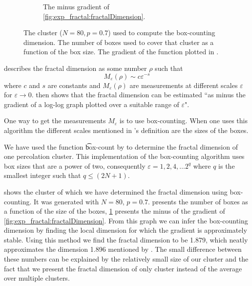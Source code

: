 \begin{figure}
\begin{subfigure}[t]{0.3\textwidth}
		\caption{The minus gradient of \cref{fig:exp_fractal:fractalDimension}.}
		\label{fig:exp_fractal:fractalDimensionGradient}
	\end{subfigure}		
	\caption{ The cluster ($N = 80, p = 0.7$) used to compute the box-counting dimension.  The number of boxes used to cover that cluster as a function of the box size.  The gradient of the function plotted in .}
	\label{fig:exp:dimension:plaatjes}
\end{figure}

\textcite{falconer2004fractal} describes the fractal dimension as some number $\rho$ such that
\begin{equation}
	M_\varepsilon(\rho) \sim c\varepsilon^{-s}
\end{equation}
where $c$ and $s$ are constants and $M_\varepsilon(\rho)$ are measurements at different scales $\varepsilon$ for $\varepsilon \to 0$. \citeauthor{falconer2004fractal} then shows that the fractal dimension can be estimated ``as minus the gradient of a log-log graph plotted over a suitable range of $\varepsilon$"\cite{falconer2004fractal}. 

One way to get the measurements $M_\varepsilon$ is to use box-counting. When one uses this algorithm the different scales mentioned in \citeauthor{falconer2004fractal}'s definition are the sizes of the boxes.

We have used the function \t{box-count} by \textcite{boxCounting} to determine the fractal dimension of one percolation cluster. This implementation of the box-counting algorithm uses box sizes that are a power of two, consequently $\varepsilon = 1, 2, 4, \dotsc 2^q$ where $q$ is the smallest integer such that $q \leq (2N + 1)$. 

 shows the cluster of which we have determined the fractal dimension using box-counting. It was generated with $N = 80$, $p = 0.7$.  presents the number of boxes as a function of the size of the boxes, \cref{fig:exp_fractal:fractalDimensionGradient} presents the minus of the gradient of \cref{fig:exp_fractal:fractalDimension}. From this graph we can infer the box-counting dimension by finding the local dimension for which the gradient is approximately stable. Using this method we find the fractal dimension to be \num{1.879}, which neatly approximates the dimension \num{1.896} mentioned by \textcite{stauffer1994introduction}. The small difference between these numbers can be explained by the relatively small size of our cluster and the fact that we present the fractal dimension of only cluster instead of the average over multiple clusters. 
